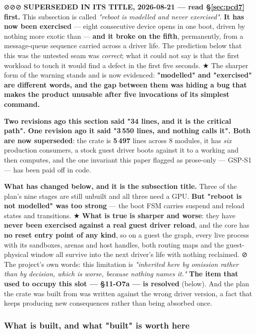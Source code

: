 \documentclass[10.5pt]{article}
\begin{document}
\begin{claimbox}\small
⊘⊘⊘ \textbf{SUPERSEDED IN ITS TITLE, 2026-08-21 --- read \S\ref{sec:pcd7} first.} This
subsection is called \emph{"reboot is modelled and never exercised"}. \textbf{It has now been
exercised} --- eight consecutive device opens in one boot, driven by nothing more exotic than
 --- \textbf{and it broke on the fifth}, permanently, from a message-queue
sequence carried across a driver life. The prediction below that this was the untested seam was
\emph{correct}; what it could not say is that the first workload to touch it would find a defect
in the first five seconds. ★ The sharper form of the warning stands and is now evidenced:
\textbf{"modelled" and "exercised" are different words, and the gap between them was hiding a
bug that makes the product unusable after five invocations of its simplest command.}

\smallskip
\textbf{Two revisions ago this section said "34 lines, and it is the critical path". One revision
ago it said "3\,550 lines, and nothing calls it". Both are now superseded}: the crate is
\textbf{5\,497} lines across 8 modules, it has \emph{six} production consumers, a stock guest
driver boots against it to a working  and then computes, and the one invariant
this paper flagged as prose-only — GSP-S1 — has been paid off in code.

\smallskip
\textbf{What has changed below, and it is the subsection title.} Three of the plan's nine stages
are still unbuilt and all three need a GPU. \textbf{But "reboot is not modelled" was too strong} —
the boot FSM carries suspend and reload states and transitions. ★ \textbf{What is true is
sharper and worse}: they have \textbf{never been exercised against a real guest driver reload},
and the core has \textbf{no reset entry point of any kind}, so on a guest  the
graph, every live process with its sandboxes, arenas and host handles, both routing maps and the
guest-physical window all survive into the next driver's life with nothing reclaimed. ⊘ The
project's own words: this limitation is \emph{"inherited here by omission rather than by decision,
which is worse, because nothing names it."} \textbf{The item that used to occupy this slot —
\S11-O7a — is resolved} (below). And the plan the crate was built from was written against the
wrong driver version, a fact that keeps producing new consequences rather than being absorbed
once.
\end{claimbox}

\subsubsection*{What is built, and what "built" is worth here}
\end{document}
